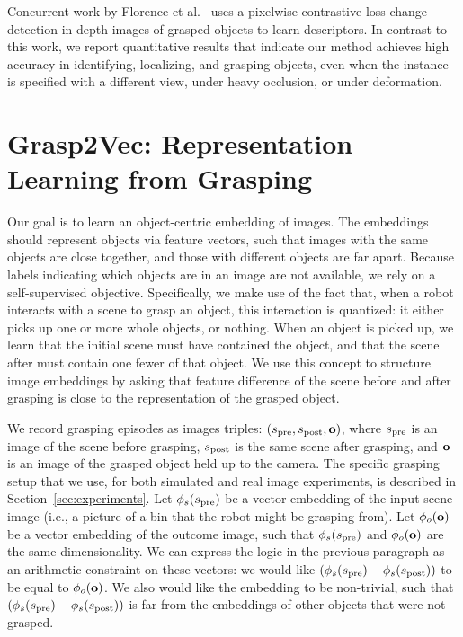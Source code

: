 \documentclass{article}
\begin{document}
Concurrent work by Florence et al.~\cite{florence2018dense} uses a pixelwise
contrastive loss change detection in depth images of grasped objects to learn descriptors.
 In contrast to this work, we report quantitative results that indicate our method achieves high accuracy in identifying, localizing, and grasping objects, even when the instance is specified with a different view, under heavy occlusion, or under deformation.

\section{Grasp2Vec: Representation Learning from Grasping}
\label{sec:grasp2vec_method}

Our goal is to learn an object-centric embedding of images. The embeddings should represent objects via feature vectors, such that images with the same objects are close together, and those with different objects are far apart. Because labels indicating which objects are in an image are not available, we rely on a self-supervised objective. Specifically, we make use of the fact that, when a robot interacts with a scene to grasp an object, this interaction is quantized: it either picks up one or more whole objects, or nothing. When an object is picked up, we learn that the initial scene must have contained the object, and that the scene after must contain one fewer of that object. We use this concept to structure image embeddings by asking that feature difference of the scene before and after grasping is close to the representation of the grasped object.


We record grasping episodes as images triples:
$(s_\text{pre}, s_\text{post}, \mathbf{o})$,
where $s_\text{pre}$ is an image of the scene before grasping, $s_\text{post}$ is the same scene after grasping, and $\mathbf{o}$ is an image of the grasped object held up to the camera. The specific grasping setup that we use, for both simulated and real image experiments, is described in Section~\ref{sec:experiments}.
Let $\phi_s(s_\text{pre})$ be a vector embedding of the input scene image (i.e., a picture of a bin that the robot might be grasping from).
Let $\phi_o(\mathbf{o})$ be a vector embedding of the outcome image,
such that $\phi_s(s_\text{pre})$ and $\phi_o(\mathbf{o})$ are the same dimensionality.
We can express the logic in the previous paragraph as an arithmetic constraint on these vectors: we would like
$(\phi_s(s_\text{pre})-\phi_s(s_\text{post}))$ to be equal to $\phi_o(\mathbf{o})$. We also would like the embedding to be non-trivial, such that $(\phi_s(s_\text{pre})-\phi_s(s_\text{post}))$ is far from the embeddings of other objects that were not grasped.
\end{document}
